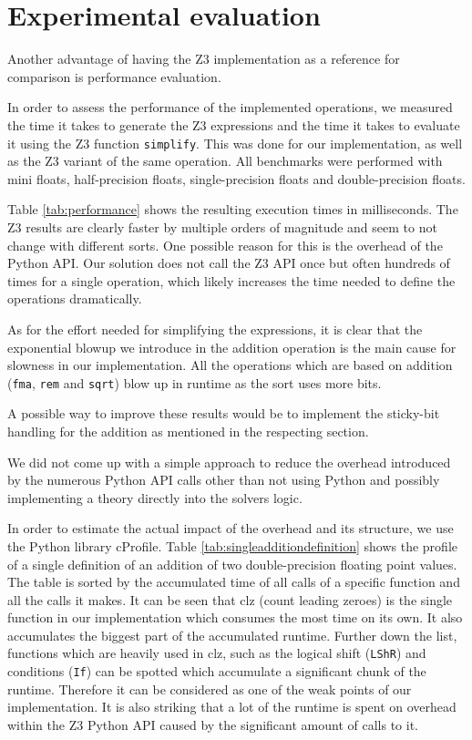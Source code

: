 \documentclass[a4paper,UKenglish,cleveref, autoref, thm-restate]{lipics-v2019}
\begin{document}
\section{Experimental evaluation}
Another advantage of having the Z3 implementation as a reference for comparison is performance evaluation.

In order to assess the performance of the implemented operations, we measured the time it takes to generate the Z3 expressions and the time it takes to evaluate it using the Z3 function \verb|simplify|. This was done for our implementation, as well as the Z3 variant of the same operation. All benchmarks were performed with mini floats, half-precision floats, single-precision floats and double-precision floats.

Table \ref{tab:performance} shows the resulting execution times in milliseconds. The Z3 results are clearly faster by multiple orders of magnitude and seem to not change with different sorts. One possible reason for this is the overhead of the Python API. Our solution does not call the Z3 API once but often hundreds of times for a single operation, which likely increases the time needed to define the operations dramatically.

As for the effort needed for simplifying the expressions, it is clear that the exponential blowup we introduce in the addition operation is the main cause for slowness in our implementation. All the operations which are based on addition (\verb|fma|, \verb|rem| and \verb|sqrt|) blow up in runtime as the sort uses more bits.

A possible way to improve these results would be to implement the sticky-bit handling for the addition as mentioned in the respecting section.

We did not come up with a simple approach to reduce the overhead introduced by the numerous Python API calls other than not using Python and possibly implementing a theory directly into the solvers logic.


In order to estimate the actual impact of the overhead and its structure, we use the Python library cProfile. Table \ref{tab:singleadditiondefinition} shows the profile of a single definition of an addition of two double-precision floating point values. The table is sorted by the accumulated time of all calls of a specific function and all the calls it makes. It can be seen that clz (count leading zeroes) is the single function in our implementation which consumes the most time on its own. It also accumulates the biggest part of the accumulated runtime. 
Further down the list, functions which are heavily used in clz, such as the logical shift (\verb|LShR|) and conditions (\verb|If|) can be spotted which accumulate a significant chunk of the runtime.
Therefore it can be considered as one of the weak points of our implementation. It is also striking that a lot of the runtime is spent on overhead within the Z3 Python API caused by the significant amount of calls to it.
\end{document}
